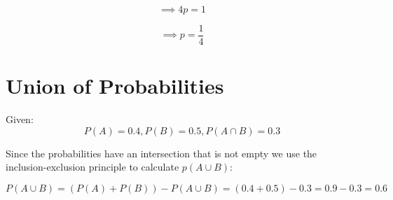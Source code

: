 \documentclass[a4paper,11pt]{article}
\begin{document}
\begin{equation}
\implies 4p = 1
\end{equation}

\begin{equation}
\implies p = \frac{1}{4}
\end{equation}

\section{Union of Probabilities}
Given:
\begin{equation}
P\left(A\right)=0.4,
P\left(B\right)=0.5,
P\left(A \cap B \right)=0.3
\end{equation}

Since the probabilities have an intersection that is not empty we use
the inclusion-exclusion principle to calculate $p\left(A \cup B\right)$:

\begin{equation}
P\left( A \cup B \right) 
= \left( P\left( A \right) + P\left( B \right) \right) - P\left( A \cup B \right)
= (0.4 + 0.5) - 0.3 = 0.9 - 0.3 = 0.6
\end{equation}
\end{document}
